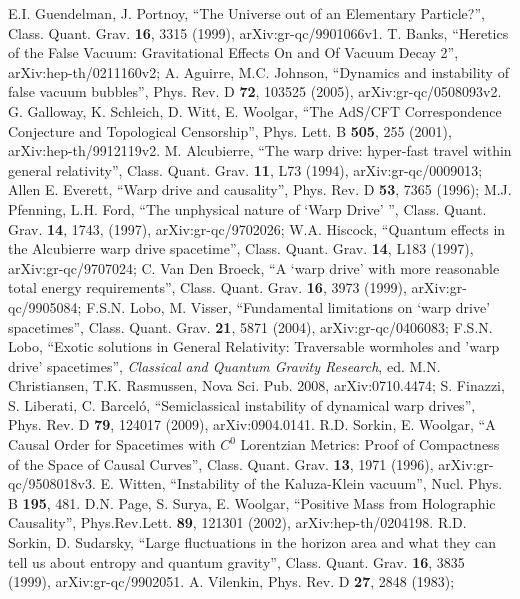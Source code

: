 \documentclass[12pt]{article}
\begin{document}
\begin{thebibliography}{99}
E.I. Guendelman, J. Portnoy, ``The Universe out of an Elementary Particle?'', Class. Quant. Grav. \textbf{16}, 3315 (1999),
 arXiv:gr-qc/9901066v1.
T. Banks, ``Heretics of the False Vacuum: Gravitational Effects On and Of Vacuum Decay 2'', arXiv:hep-th/0211160v2;
A. Aguirre, M.C. Johnson, ``Dynamics and instability of false vacuum bubbles'', Phys. Rev. D \textbf{72}, 103525 (2005), arXiv:gr-qc/0508093v2.
G. Galloway, K. Schleich, D. Witt, E. Woolgar, ``The AdS/CFT Correspondence Conjecture and Topological Censorship'', Phys. Lett. B \textbf{505}, 255 (2001), arXiv:hep-th/9912119v2.
M. Alcubierre, ``The warp drive: hyper-fast travel within general relativity'', Class. Quant. Grav. \textbf{11}, L73 (1994),  	arXiv:gr-qc/0009013; Allen E. Everett, ``Warp drive and causality'', Phys. Rev. D \textbf{53}, 7365 (1996); M.J. Pfenning, L.H. Ford, ``The unphysical nature of `Warp Drive' '', Class. Quant. Grav. \textbf{14}, 1743, (1997), arXiv:gr-qc/9702026; W.A. Hiscock, ``Quantum effects in the Alcubierre warp drive spacetime'', Class. Quant. Grav. \textbf{14}, L183 (1997), arXiv:gr-qc/9707024; C. Van Den Broeck, ``A `warp drive' with more reasonable total energy requirements'',  Class. Quant. Grav. \textbf{16}, 3973 (1999), arXiv:gr-qc/9905084; F.S.N. Lobo, M. Visser, ``Fundamental limitations on `warp drive' spacetimes'', Class. Quant. Grav. \textbf{21}, 5871 (2004), arXiv:gr-qc/0406083; F.S.N. Lobo, ``Exotic solutions in General Relativity: Traversable wormholes and 'warp drive' spacetimes'', \textit{Classical and Quantum Gravity Research}, ed. M.N. Christiansen, T.K. Rasmussen, Nova Sci. Pub. 2008,  arXiv:0710.4474; S. Finazzi, S. Liberati, C. Barcel\'{o}, ``Semiclassical instability of dynamical warp drives'', Phys. Rev. D \textbf{79}, 124017 (2009), arXiv:0904.0141.
R.D. Sorkin, E. Woolgar, ``A Causal Order for Spacetimes with $C^0$ Lorentzian Metrics: Proof of Compactness of the Space of Causal Curves'', Class. Quant. Grav. \textbf{13}, 1971 (1996), arXiv:gr-qc/9508018v3.
E. Witten, ``Instability of the Kaluza-Klein vacuum'', Nucl. Phys. B \textbf{195}, 481.
D.N. Page, S. Surya, E. Woolgar, ``Positive Mass from Holographic Causality'', Phys.Rev.Lett. \textbf{89}, 121301 (2002),  	arXiv:hep-th/0204198.
R.D. Sorkin, D. Sudarsky, ``Large fluctuations in the horizon area and what they can tell us about entropy and quantum gravity'', Class. Quant. Grav. \textbf{16}, 3835 (1999), arXiv:gr-qc/9902051.
A. Vilenkin, Phys. Rev. D \textbf{27}, 2848 (1983);

\end{thebibliography}
\end{document}
